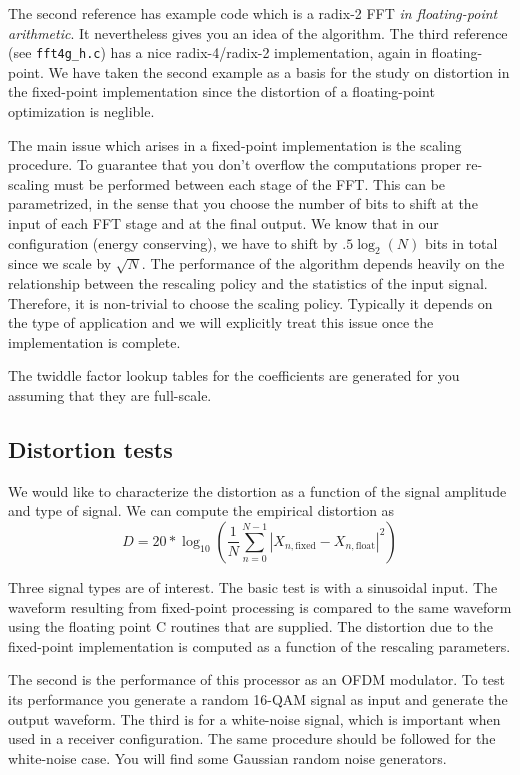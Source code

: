 \documentclass[11pt]{article}
\begin{document}
The second reference has example code which is a radix-2 FFT {\em in floating-point arithmetic}.  
It nevertheless gives you an idea of the algorithm.  The third reference (see {\tt fft4g\_h.c}) has a nice 
radix-4/radix-2 implementation, again in floating-point. We have taken the second example as a basis for the study on 
distortion in the fixed-point implementation since the distortion of a floating-point optimization is neglible.

The main issue which arises in a fixed-point implementation is the scaling procedure.  To guarantee that you don't overflow
the computations proper re-scaling must be performed between each stage of the FFT.  This can be parametrized, in the sense that you choose
the number of bits to shift at the input of each FFT stage and at the final output. We know that in our configuration (energy conserving),
we have to shift by $.5\log_2(N)$ bits in total since we scale by $\sqrt{N}$.    The performance
of the algorithm depends heavily on the relationship between the rescaling policy and the statistics of the input signal.  Therefore,
it is non-trivial to choose the scaling policy.  Typically it depends on the type of application and we will explicitly treat this issue 
once the implementation is complete.

The twiddle factor lookup tables for the coefficients are generated for you assuming that they are full-scale. 



\subsection{Distortion tests}
We would like to characterize the distortion as a function of the signal amplitude and type of signal.  We can compute the empirical distortion as
\begin{equation}
D = 20*\log_{10}\left(\frac{1}{N}\sum_{n=0}^{N-1}|X_{n,\mathrm{fixed}}- X_{n,\mathrm{float}}|^2\right)
\end{equation}
  
Three signal types are of interest.  The basic test is with a sinusoidal input. The waveform resulting from fixed-point processing is compared 
to the same waveform using the floating point C routines that are supplied.  The distortion due to the fixed-point implementation 
is computed as a function of the rescaling parameters.

The second is the performance of this processor as an OFDM modulator. To test its performance you generate a
random 16-QAM signal as input and generate the output waveform.    The third is for a white-noise signal, 
which is important when used in a receiver configuration.  The same procedure should be followed for the 
white-noise case. You will find some Gaussian random noise generators.  
\end{document}

